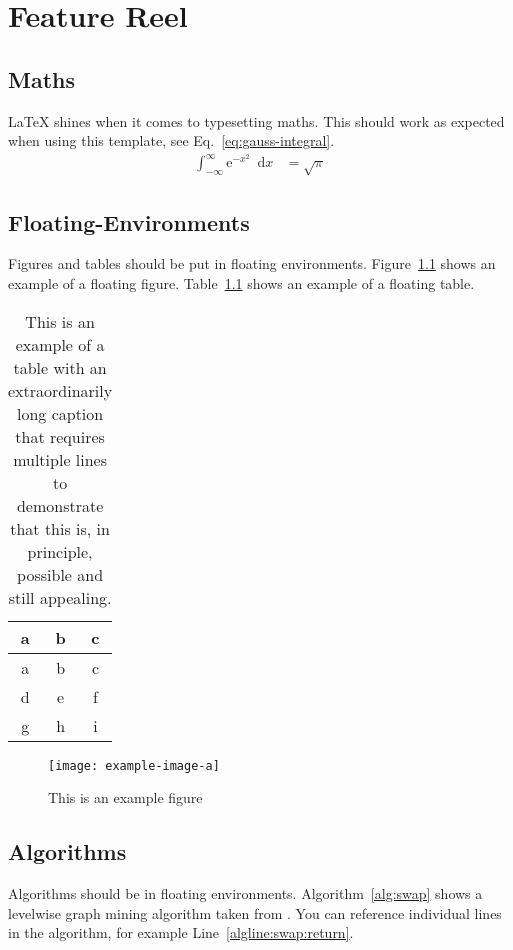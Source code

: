 \chapter{Feature Reel} 

\section{Maths}

\LaTeX{} shines when it comes to typesetting maths. This should work as expected when using this template, see Eq.~\eqref{eq:gauss-integral}. 
\begin{align}\label{eq:gauss-integral}
	\int_{-\infty}^{\infty} \mathrm{e}^{-x^2} \enspace \mathrm{d}x &= \sqrt{\pi} 
\end{align}

\section{Floating-Environments} 

Figures and tables should be put in floating environments.
Figure~\ref{fig:example-fig} shows an example of a floating figure.
Table~\ref{tab:example-table} shows an example of a floating table.

\begin{table}[ht]
	\centering
	\begin{tabular}{ccc}
		\toprule
		a & b & c \\
		\midrule
		a & b & c \\
		d & e & f \\
		g & h & i \\
		\bottomrule
	\end{tabular}
	\caption{This is an example of a table with an extraordinarily long caption that requires multiple lines to demonstrate that this is, in principle, possible and still appealing.}
	\label{tab:example-table} 
\end{table}

\begin{figure}[ht]
	\centering 
	\texttt{[image: example-image-a]}
	\caption{This is an example figure} 
	\label{fig:example-fig} 
\end{figure}

\section{Algorithms} 
% 
Algorithms should be in floating environments. 
Algorithm~\ref{alg:swap} shows a levelwise graph mining algorithm taken from \cite{theoremofbenda}.
You can reference individual lines in the algorithm, for example Line~\ref{algline:swap:return}.

